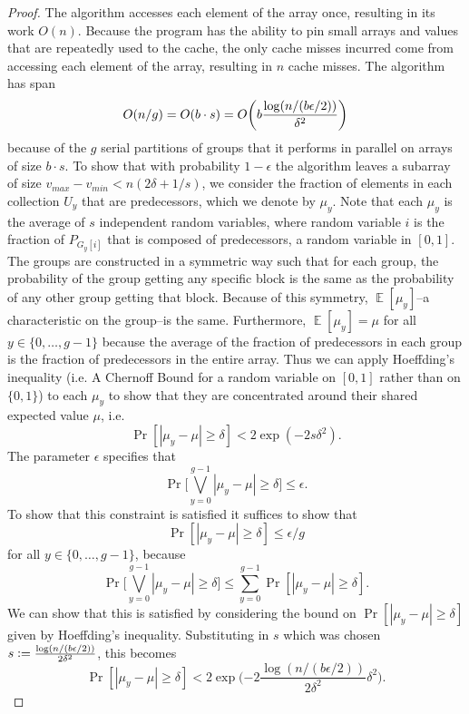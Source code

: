 \documentclass[sigconf]{acmart}
\newcommand{\defeq}{\vcentcolon=}
\DeclarePairedDelimiter{\paren}{(}{)}
\def\E{\operatorname{\mathbb{E}}}
\theoremstyle{remark}
\theoremstyle{remark}
\begin{document}
\begin{proof}
	The algorithm accesses each element of the array once, resulting in its work $O(n)$.
	Because the program has the ability to pin small arrays and values that are repeatedly used to the cache, the only cache misses incurred come from accessing each element of the array, resulting in $n$ cache misses.
	The algorithm has span $$O(n/g) = O(b\cdot s) = O\paren*{b \frac{\log (n/(b\epsilon/2))}{\delta^2}}$$
	because of the $g$ serial partitions of groups that it performs in parallel on arrays of size $b\cdot s$.
	To show that with probability $1-\epsilon$ the algorithm leaves a subarray of size $v_{max}-v_{min} < n(2\delta + 1/s)$, we consider the fraction of elements in each collection $U_y$ that are predecessors, which we denote by $\mu_y$.
	Note that each $\mu_y$ is the average of $s$ independent random variables, where random variable $i$ is the fraction of $P_{G_y[i]}$ that is composed of predecessors, a random variable in $[0, 1]$.
	The groups are constructed in a symmetric way such that for each group, the probability of the group getting any specific block is the same as the probability of any other group getting that block. 
	Because of this symmetry, $\E[\mu_y]$--a characteristic on the group--is the same.
	Furthermore, $\E[\mu_y] = \mu$ for all $y \in \{0,\ldots,g-1\}$ because the average of the fraction of predecessors in each group is the fraction of predecessors in the entire array.	
	Thus we can apply Hoeffding's inequality (i.e. A Chernoff Bound for a random variable on $[0,1]$ rather than on $\{0,1\}$) to each $\mu_y$ to show that they are concentrated around their shared expected value $\mu$, i.e.
	$$\Pr[|\mu_y - \mu| \geq \delta] < 2\exp(-2s\delta^2). $$
	The parameter $\epsilon$ specifies that 
	$$\Pr\Big[\bigvee_{y=0}^{g-1} |\mu_y - \mu| \geq \delta\Big] \leq \epsilon.$$
	To show that this constraint is satisfied it suffices to show that 
	$$\Pr[|\mu_y - \mu| \geq \delta] \leq \epsilon/g $$ for all $y\in \{0,\ldots,g-1\}$, because
	$$\Pr\Big[\bigvee_{y=0}^{g-1} |\mu_y - \mu| \geq \delta\Big] \leq \sum_{y=0}^{g-1} \Pr[|\mu_y - \mu| \geq \delta].$$
	We can show that this is satisfied by considering the bound on $\Pr[|\mu_y - \mu| \geq \delta]$ given by Hoeffding's inequality. 
	Substituting in $s$ which was chosen $s\defeq \frac{\log (n/(b\epsilon/2))}{2\delta^2}$, this becomes
	$$\Pr[|\mu_y - \mu| \geq \delta] < 2\exp\Big({-2} \frac{\log (n/(b\epsilon/2))}{2\delta^2} \delta^2\Big). $$

\end{proof}
\end{document}
